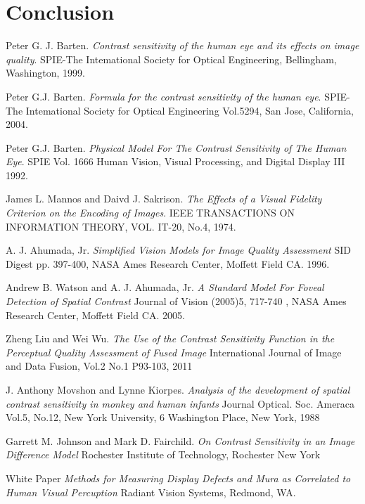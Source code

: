 \documentclass{article}
\begin{document}
\section{Conclusion}

\clearpage
\begin{thebibliography}{8}
Peter G. J. Barten. 
\textit{Contrast sensitivity of the human eye and its effects on image quality}. 
SPIE-The Intemational Society for Optical Engineering, Bellingham, Washington, 1999.

Peter G.J. Barten.
\textit{Formula for the contrast sensitivity of the human eye}.
SPIE-The Intemational Society for Optical Engineering Vol.5294, San Jose, California, 2004.

Peter G.J. Barten.
\textit{Physical Model For The Contrast Sensitivity of The Human Eye}.
SPIE Vol. 1666 Human Vision, Visual Processing, and Digital Display III 1992.

James L. Mannos and Daivd J. Sakrison.
\textit{The Effects of a Visual Fidelity Criterion on the Encoding of Images}.
IEEE TRANSACTIONS ON INFORMATION THEORY, VOL. IT-20, No.4, 1974.

A. J. Ahumada, Jr.
\textit{Simplified Vision Models for Image Quality Assessment}
SID Digest pp. 397-400, NASA Ames Research Center, Moffett Field CA. 1996.

Andrew B. Watson and A. J. Ahumada, Jr.
\textit{A Standard Model For Foveal Detection of Spatial Contrast}
Journal of Vision (2005)5, 717-740 , NASA Ames Research Center, Moffett Field CA. 2005.

Zheng Liu and Wei Wu.
\textit{The Use of the Contrast Sensitivity Function in the Perceptual Quality Assessment of Fused Image}
International Journal of Image and Data Fusion, Vol.2 No.1 P93-103, 2011

J. Anthony Movshon and Lynne Kiorpes.
\textit{Analysis of the development of spatial contrast sensitivity in monkey and human infants}
Journal Optical. Soc. Ameraca Vol.5, No.12, New York University, 6 Washington Place, New York, 1988

Garrett M. Johnson and Mark D. Fairchild.
\textit{On Contrast Sensitivity in an Image Difference Model}
Rochester Institute of Technology, Rochester New York

White Paper
\textit{Methods for Measuring Display Defects and Mura as Correlated to Human Visual Percuption}
Radiant Vision Systems, Redmond, WA.

\end{thebibliography}
\end{document}
